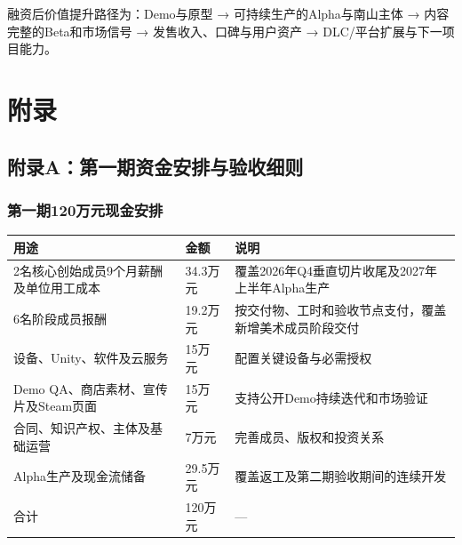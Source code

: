 \documentclass[UTF8,fontset=none,zihao=5,twoside]{ctexart}
\newcounter{none}
\newenvironment{BusinessTable}{%
  \begingroup
  \small
  \setlength{\parindent}{0pt}%
  \setlength{\parskip}{0pt}%
  \rowcolors{2}{TableAlt}{white}%
}{%
  \endgroup
}
\begin{document}
融资后价值提升路径为：Demo与原型 → 可持续生产的Alpha与南山主体 → 内容完整的Beta和市场信号 → 发售收入、口碑与用户资产 → DLC/平台扩展与下一项目能力。

\section{附录}\label{ux9644ux5f55}

\subsection{附录A：第一期资金安排与验收细则}\label{ux9644ux5f55aux7b2cux4e00ux671fux8d44ux91d1ux5b89ux6392ux4e0eux9a8cux6536ux7ec6ux5219}

\subsubsection{第一期120万元现金安排}\label{ux7b2cux4e00ux671f120ux4e07ux5143ux73b0ux91d1ux5b89ux6392}

\begin{BusinessTable}

{\def\LTcaptype{none} %
\begin{longtable}[]{@{}
  >{\raggedright\arraybackslash}p{}
  >{\raggedright\arraybackslash}p{}
  >{\raggedright\arraybackslash}p{}@{}}
\toprule\noalign{}
\begin{minipage}[b]{\linewidth}\raggedright
\cellcolor{TableHeader}\color{BrandBlue}\bfseries 用途
\end{minipage} & \begin{minipage}[b]{\linewidth}\raggedright
\cellcolor{TableHeader}\color{BrandBlue}\bfseries 金额
\end{minipage} & \begin{minipage}[b]{\linewidth}\raggedright
\cellcolor{TableHeader}\color{BrandBlue}\bfseries 说明
\end{minipage} \\
\midrule\noalign{}
\endhead
\bottomrule\noalign{}
\endlastfoot
2名核心创始成员9个月薪酬及单位用工成本 & 34.3万元 & 覆盖2026年Q4垂直切片收尾及2027年上半年Alpha生产 \\
6名阶段成员报酬 & 19.2万元 & 按交付物、工时和验收节点支付，覆盖新增美术成员阶段交付 \\
设备、Unity、软件及云服务 & 15万元 & 配置关键设备与必需授权 \\
Demo QA、商店素材、宣传片及Steam页面 & 15万元 & 支持公开Demo持续迭代和市场验证 \\
合同、知识产权、主体及基础运营 & 7万元 & 完善成员、版权和投资关系 \\
Alpha生产及现金流储备 & 29.5万元 & 覆盖返工及第二期验收期间的连续开发 \\
合计 & 120万元 & --- \\
\end{longtable}
}

\end{BusinessTable}
\end{document}
